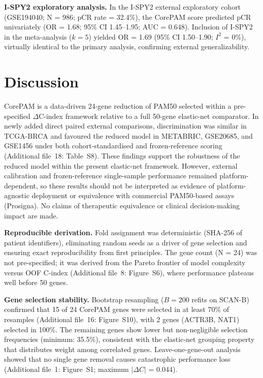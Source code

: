 \documentclass[referee,lineno,pdflatex,sn-vancouver-num]{sn-jnl}
\begin{document}
\textbf{I-SPY2 exploratory analysis.} In the I-SPY2 external exploratory cohort (GSE194040; N = 986; pCR rate = 32.4\%), the CorePAM score predicted pCR univariately (OR = 1.68; 95\% CI 1.45--1.95; AUC = 0.648). Inclusion of I-SPY2 in the meta-analysis ($k = 5$) yielded OR = 1.69 (95\% CI 1.50--1.90; $I^2$ = 0\%), virtually identical to the primary analysis, confirming external generalizability.

\section{Discussion}\label{sec:discussion}

CorePAM is a data-driven 24-gene reduction of PAM50 selected within a pre-specified $\Delta$C-index framework relative to a full 50-gene elastic-net comparator. In newly added direct paired external comparisons, discrimination was similar in TCGA-BRCA and favoured the reduced model in METABRIC, GSE20685, and GSE1456 under both cohort-standardised and frozen-reference scoring (Additional file~18: Table~S8). These findings support the robustness of the reduced model within the present elastic-net framework. However, external calibration and frozen-reference single-sample performance remained platform-dependent, so these results should not be interpreted as evidence of platform-agnostic deployment or equivalence with commercial PAM50-based assays (Prosigna). No claims of therapeutic equivalence or clinical decision-making impact are made.

\textbf{Reproducible derivation.} Fold assignment was deterministic (SHA-256 of patient identifiers), eliminating random seeds as a driver of gene selection and ensuring exact reproducibility from first principles. The gene count (N = 24) was not pre-specified; it was derived from the Pareto frontier of model complexity versus OOF C-index (Additional file~8: Figure~S6), where performance plateaus well before 50 genes.

\textbf{Gene selection stability.} Bootstrap resampling ($B = 200$ refits on SCAN-B) confirmed that 15 of 24 CorePAM genes were selected in at least 70\% of resamples (Additional file~16: Figure~S10), with 2 genes (ACTR3B, NAT1) selected in 100\%. The remaining genes show lower but non-negligible selection frequencies (minimum: 35.5\%), consistent with the elastic-net grouping property that distributes weight among correlated genes. Leave-one-gene-out analysis showed that no single gene removal causes catastrophic performance loss (Additional file~1: Figure~S1; maximum $|\Delta C|$ = 0.044).
\end{document}

